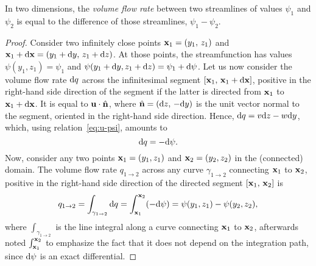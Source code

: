 \begin{property} \label{prop:streamfunction-flowrate}
	In two dimensions, the \textit{volume flow rate} between two streamlines of values $\psi_1$ and $\psi_2$ is equal to the difference of those streamlines, $\psi_1 - \psi_2$.
\end{property}
\begin{proof}
	Consider two infinitely close points $\b x_1 = (y_1,\, z_1)$ and $\b x_1 + \rm d \b x = (y_1 + \rm dy,\, z_1 + \rm dz)$. At those points, the streamfunction has values $\psi(y_1,z_1) = \psi_1$ and $\psi(y_1+\rm dy,z_1 + \rm dz) = \psi_1 + \rm d\psi$. Let us now consider the volume flow rate $\rm dq$ across the infinitesimal segment $[\b x_1,\, \b x_1 + \rm d \b x]$, positive in the right-hand side direction of the segment if the latter is directed from $\b x_1$ to $\b x_1 + \rm d \b x$. It is equal to $\b u \cdot \hat{\b{n}}$, where $\hat{\b{n}} = (\rm dz,\,-\rm dy)$ is the unit vector normal to the segment, oriented in the right-hand side direction. Hence, $\rm dq = v \rm dz - w \rm dy$, which, using relation~\eqref{eq:u-psi}, amounts to
	\begin{equation}
		\rm dq = - \rm d\psi.
	\end{equation}
	Now, consider any two points $\b x_1 = (y_1, z_1)$ and $\b x_2 = (y_2, z_2)$ in the (connected) domain. The volume flow rate $q_{1 \rightarrow 2}$ across any curve $\gamma_{1 \rightarrow 2}$ connecting $\b x_1$ to $\b x_2$, positive in the right-hand side direction of the directed segment $[\b x_1,\, \b x_2]$ is
	\begin{equation}
		q_{1 \rightarrow 2} = \int_{\gamma_{1 \rightarrow 2}} \rm dq = \int_{\b x_1}^{\b x_2} (-\rm d\psi) = \psi(y_1,z_1) - \psi(y_2,z_2), 	
	\end{equation} 
	where $\int_{\gamma_{1 \rightarrow 2}}$ is the line integral along a curve connecting $\b x_1$ to $\b x_2$, afterwards noted $\int_{\b x_1}^{\b x_2}$ to emphasize the fact that it does not depend on the integration path, since $\rm d\psi$ is an exact differential.
\end{proof}
